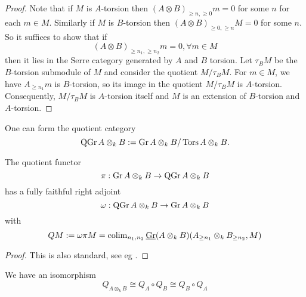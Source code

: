\documentclass[dissertation.tex]{subfiles}
\begin{document}
\begin{proof}
  Note that if \(M\) is \(A\)-torsion then \((A \otimes B)_{\geq n, \geq 0} m = 0\) for some \(n\) for each \(m \in M\). Similarly if \(M\) is \(B\)-torsion then \((A \otimes B)_{\geq 0,\geq n} M = 0\) for some \(n\). So it suffices to show that if
  \begin{displaymath}
    (A \otimes B)_{\geq n_1, \geq n_2} m = 0 , \forall m \in M
  \end{displaymath}
  then it lies in the Serre category generated by \(A\) and \(B\) torsion. Let \(\tau_B M\) be the \(B\)-torsion submodule of \(M\) and consider the quotient \(M/\tau_B M\). For \(m \in M\), we have \(A_{\geq n_1}m\) is \(B\)-torsion, so its image in the quotient \(M/\tau_B M\) is \(A\)-torsion. Consequently, \(M / \tau_B M\) is \(A\)-torsion itself and \(M\) is an extension of \(B\)-torsion and \(A\)-torsion. 
\end{proof}

One can form the quotient category
\begin{displaymath}
  \operatorname{QGr}A \otimes_k B := \operatorname{Gr}A \otimes_k B / \operatorname{Tors}A \otimes_k B.
\end{displaymath}

\begin{lemma} \label{lemma: biQ and bQGr}
  The quotient functor 
  \begin{displaymath}
    \pi : \operatorname{Gr}A \otimes_k B \to \operatorname{QGr}A \otimes_k B
  \end{displaymath}
  has a fully faithful right adjoint 
  \begin{displaymath}
    \omega : \operatorname{QGr}A \otimes_k B \to \operatorname{Gr}A \otimes_k B
  \end{displaymath}
  with 
  \begin{displaymath}
    QM := \omega \pi M = \operatorname{colim}_{n_1,n_2} \underline{\operatorname{Gr}}(A \otimes_k B)( A_{\geq n_1} \otimes_k B_{\geq n_2} , M)
  \end{displaymath}
\end{lemma}

\begin{proof}
  This is also standard, see eg \cite{Stenstrom}. 
\end{proof}

\begin{corollary}\label{corollary: relation on Qs}
  We have an isomorphism 
  \begin{displaymath}
    Q_{A \otimes_k B} \cong Q_A \circ Q_B \cong Q_B \circ Q_A
  \end{displaymath}
\end{corollary}
\end{document}
